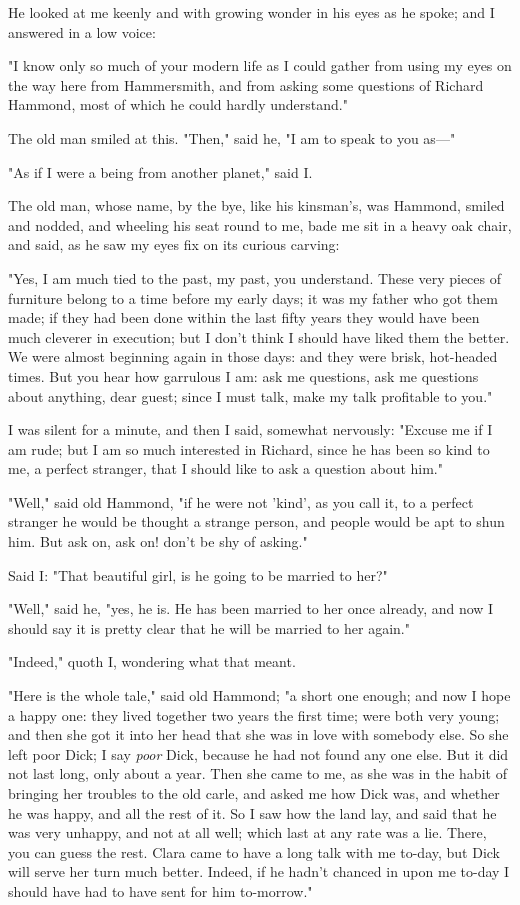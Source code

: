 He looked at me keenly and with growing wonder in his eyes as he spoke;
and I answered in a low voice:

"I know only so much of your modern life as I could gather from using my
eyes on the way here from Hammersmith, and from asking some questions of
Richard Hammond, most of which he could hardly understand."

The old man smiled at this. "Then," said he, "I am to speak to you
as---"

"As if I were a being from another planet," said I.

The old man, whose name, by the bye, like his kinsman's, was Hammond,
smiled and nodded, and wheeling his seat round to me, bade me sit in a
heavy oak chair, and said, as he saw my eyes fix on its curious carving:

"Yes, I am much tied to the past, my past, you understand. These very
pieces of furniture belong to a time before my early days; it was my
father who got them made; if they had been done within the last fifty
years they would have been much cleverer in execution; but I don't think
I should have liked them the better. We were almost beginning again in
those days: and they were brisk, hot-headed times. But you hear how
garrulous I am: ask me questions, ask me questions about anything, dear
guest; since I must talk, make my talk profitable to you."

I was silent for a minute, and then I said, somewhat nervously: "Excuse
me if I am rude; but I am so much interested in Richard, since he has
been so kind to me, a perfect stranger, that I should like to ask a
question about him."

"Well," said old Hammond, "if he were not 'kind', as you call it, to a
perfect stranger he would be thought a strange person, and people would
be apt to shun him. But ask on, ask on! don't be shy of asking."

Said I: "That beautiful girl, is he going to be married to her?"

"Well," said he, "yes, he is. He has been married to her once already,
and now I should say it is pretty clear that he will be married to her
again."

"Indeed," quoth I, wondering what that meant.

"Here is the whole tale," said old Hammond; "a short one enough; and now
I hope a happy one: they lived together two years the first time; were
both very young; and then she got it into her head that she was in love
with somebody else. So she left poor Dick; I say \emph{poor} Dick,
because he had not found any one else. But it did not last long, only
about a year. Then she came to me, as she was in the habit of bringing
her troubles to the old carle, and asked me how Dick was, and whether he
was happy, and all the rest of it. So I saw how the land lay, and said
that he was very unhappy, and not at all well; which last at any rate
was a lie. There, you can guess the rest. Clara came to have a long talk
with me to-day, but Dick will serve her turn much better. Indeed, if he
hadn't chanced in upon me to-day I should have had to have sent for him
to-morrow."

